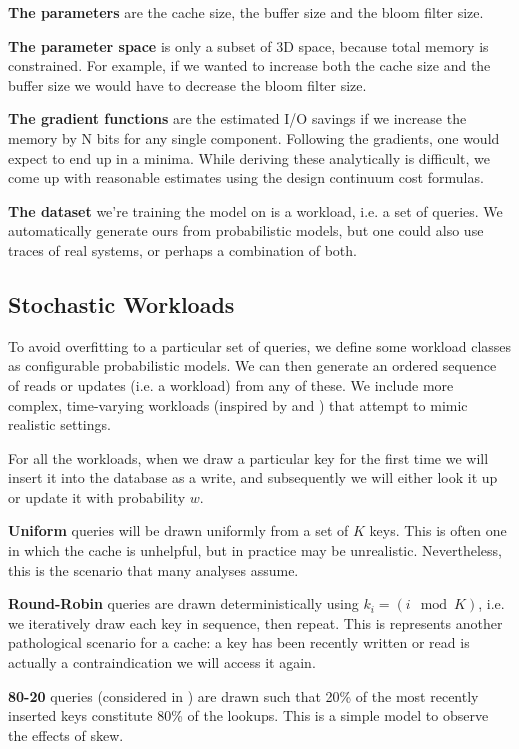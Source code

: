 \documentclass{cidr-2019}
\begin{document}
\textbf{The parameters} are the cache size, the buffer size and the bloom
filter size.

\textbf{The parameter space} is only a subset of 3D space, because total memory
is constrained. For example, if we wanted to increase both the cache size and
the buffer size we would have to decrease the bloom filter size.

\textbf{The gradient functions} are the estimated I/O savings if we increase
the memory by N bits for any single component. Following the gradients, one
would expect to end up in a minima. While deriving these analytically is
difficult, we come up with reasonable estimates using the design continuum cost
formulas.

\textbf {The dataset} we're training the model on is a workload, i.e. a set of
queries. We automatically generate ours from probabilistic models, but one
could also use traces of real systems, or perhaps a combination of both.

\subsection{Stochastic Workloads}

To avoid overfitting to a particular set of queries, we define some workload
classes as configurable probabilistic models. We can then generate an ordered
sequence of reads or updates (i.e. a workload) from any of these. We include
more complex, time-varying workloads (inspired by
\cite{characterizing-memcached} and \cite{linkbench}) that attempt to mimic
realistic settings.

For all the workloads, when we draw a particular key for the first time we
will insert it into the database as a write, and subsequently we will either
look it up or update it with probability $w$.

\textbf{Uniform} queries will be drawn uniformly from a set of $K$ keys. This is
often one in which the cache is unhelpful, but in practice may be unrealistic.
Nevertheless, this is the scenario that many analyses assume.

\textbf{Round-Robin} queries are drawn deterministically using $k_i = (i \mod
K)$, i.e. we iteratively draw each key in sequence, then repeat.
This is represents another pathological scenario for a cache: a key has been
recently written or read is actually a contraindication we will access it
again.

\textbf{80-20} queries (considered in \cite{monkey}) are drawn such that 20\%
of the most recently inserted keys constitute 80\% of the lookups. This is a
simple model to observe the effects of skew.
\end{document}
